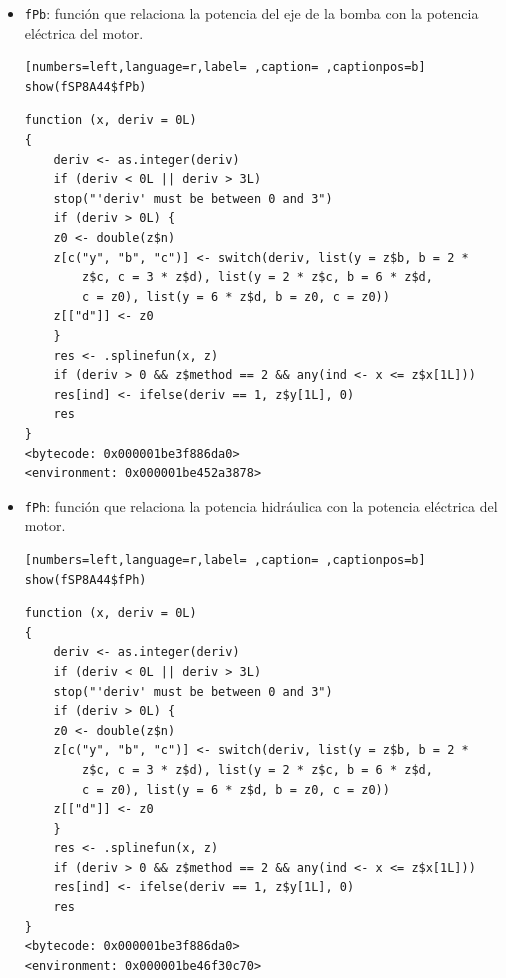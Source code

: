 \begin{itemize}
\begin{itemize}
\begin{verbatim}
function (x, deriv = 0L) 
{
    deriv <- as.integer(deriv)
    if (deriv < 0L || deriv > 3L) 
	stop("'deriv' must be between 0 and 3")
    if (deriv > 0L) {
	z0 <- double(z$n)
	z[c("y", "b", "c")] <- switch(deriv, list(y = z$b, b = 2 * 
	    z$c, c = 3 * z$d), list(y = 2 * z$c, b = 6 * z$d, 
	    c = z0), list(y = 6 * z$d, b = z0, c = z0))
	z[["d"]] <- z0
    }
    res <- .splinefun(x, z)
    if (deriv > 0 && z$method == 2 && any(ind <- x <= z$x[1L])) 
	res[ind] <- ifelse(deriv == 1, z$y[1L], 0)
    res
}
<bytecode: 0x000001be3f886da0>
<environment: 0x000001be43072178>
\end{verbatim}

\item \texttt{fPb}: función que relaciona la potencia del eje de la bomba con la potencia eléctrica del motor.
\begin{lstlisting}[numbers=left,language=r,label= ,caption= ,captionpos=b]
show(fSP8A44$fPb)
\end{lstlisting}

\begin{verbatim}
function (x, deriv = 0L) 
{
    deriv <- as.integer(deriv)
    if (deriv < 0L || deriv > 3L) 
	stop("'deriv' must be between 0 and 3")
    if (deriv > 0L) {
	z0 <- double(z$n)
	z[c("y", "b", "c")] <- switch(deriv, list(y = z$b, b = 2 * 
	    z$c, c = 3 * z$d), list(y = 2 * z$c, b = 6 * z$d, 
	    c = z0), list(y = 6 * z$d, b = z0, c = z0))
	z[["d"]] <- z0
    }
    res <- .splinefun(x, z)
    if (deriv > 0 && z$method == 2 && any(ind <- x <= z$x[1L])) 
	res[ind] <- ifelse(deriv == 1, z$y[1L], 0)
    res
}
<bytecode: 0x000001be3f886da0>
<environment: 0x000001be452a3878>
\end{verbatim}

\item \texttt{fPh}: función que relaciona la potencia hidráulica con la potencia eléctrica del motor.
\begin{lstlisting}[numbers=left,language=r,label= ,caption= ,captionpos=b]
show(fSP8A44$fPh)
\end{lstlisting}

\begin{verbatim}
function (x, deriv = 0L) 
{
    deriv <- as.integer(deriv)
    if (deriv < 0L || deriv > 3L) 
	stop("'deriv' must be between 0 and 3")
    if (deriv > 0L) {
	z0 <- double(z$n)
	z[c("y", "b", "c")] <- switch(deriv, list(y = z$b, b = 2 * 
	    z$c, c = 3 * z$d), list(y = 2 * z$c, b = 6 * z$d, 
	    c = z0), list(y = 6 * z$d, b = z0, c = z0))
	z[["d"]] <- z0
    }
    res <- .splinefun(x, z)
    if (deriv > 0 && z$method == 2 && any(ind <- x <= z$x[1L])) 
	res[ind] <- ifelse(deriv == 1, z$y[1L], 0)
    res
}
<bytecode: 0x000001be3f886da0>
<environment: 0x000001be46f30c70>
\end{verbatim}


\end{itemize}
\end{itemize}
